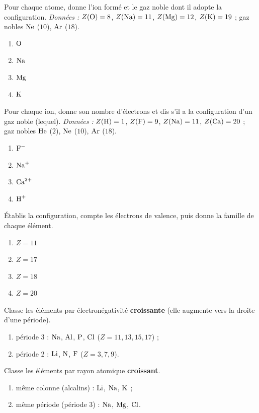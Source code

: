 \documentclass[11pt,a4paper]{article}
\begin{document}
\begin{exo}
Pour chaque atome, donne l'ion formé et le gaz noble dont il adopte la configuration.
\textit{Données :} $Z(\ce{O})=8$, $Z(\ce{Na})=11$, $Z(\ce{Mg})=12$, $Z(\ce{K})=19$ ; gaz nobles
$\ce{Ne}$ ($10$), $\ce{Ar}$ ($18$).
\begin{enumerate}[label=\alph*)]
  \item $\ce{O}$
  \item $\ce{Na}$
  \item $\ce{Mg}$
  \item $\ce{K}$
\end{enumerate}
\end{exo}

\begin{exo}
Pour chaque ion, donne son nombre d'électrons et dis s'il a la configuration d'un gaz noble (lequel).
\textit{Données :} $Z(\ce{H})=1$, $Z(\ce{F})=9$, $Z(\ce{Na})=11$, $Z(\ce{Ca})=20$ ; gaz nobles
$\ce{He}$ ($2$), $\ce{Ne}$ ($10$), $\ce{Ar}$ ($18$).
\begin{enumerate}[label=\alph*)]
  \item $\ce{F^{-}}$
  \item $\ce{Na^{+}}$
  \item $\ce{Ca^{2+}}$
  \item $\ce{H^{+}}$
\end{enumerate}
\end{exo}

\begin{exo}
Établis la configuration, compte les électrons de valence, puis donne la famille de chaque élément.
\begin{enumerate}[label=\alph*)]
  \item $Z = 11$
  \item $Z = 17$
  \item $Z = 18$
  \item $Z = 20$
\end{enumerate}
\end{exo}

\begin{exo}
Classe les éléments par électronégativité \textbf{croissante} (elle augmente vers la droite d'une période).
\begin{enumerate}[label=\alph*)]
  \item période 3 : $\ce{Na}$, $\ce{Al}$, $\ce{P}$, $\ce{Cl}$ ($Z = 11, 13, 15, 17$) ;
  \item période 2 : $\ce{Li}$, $\ce{N}$, $\ce{F}$ ($Z = 3, 7, 9$).
\end{enumerate}
\end{exo}

\begin{exo}
Classe les éléments par rayon atomique \textbf{croissant}.
\begin{enumerate}[label=\alph*)]
  \item même colonne (alcalins) : $\ce{Li}$, $\ce{Na}$, $\ce{K}$ ;
  \item même période (période 3) : $\ce{Na}$, $\ce{Mg}$, $\ce{Cl}$.
\end{enumerate}
\end{exo}
\end{document}
